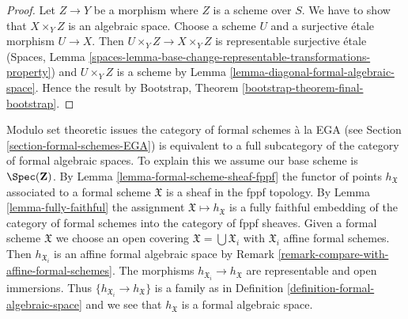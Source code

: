 \begin{proof}
Let $Z \to Y$ be a morphism where $Z$ is a scheme over $S$.
We have to show that $X \times_Y Z$ is an algebraic space.
Choose a scheme $U$ and a surjective \'etale morphism $U \to X$.
Then $U \times_Y Z \to X \times_Y Z$ is representable surjective \'etale
(Spaces, Lemma
\ref{spaces-lemma-base-change-representable-transformations-property})
and $U \times_Y Z$ is a scheme by
Lemma \ref{lemma-diagonal-formal-algebraic-space}.
Hence the result by
Bootstrap, Theorem \ref{bootstrap-theorem-final-bootstrap}.
\end{proof}

\begin{remark}
\label{remark-compare-with-formal-schemes}
Modulo set theoretic issues the category of formal schemes \`a la EGA
(see Section \ref{section-formal-schemes-EGA}) is equivalent to a full
subcategory of the category of formal algebraic spaces. To explain this
we assume our base scheme is $\Spec(\mathbf{Z})$. By
Lemma \ref{lemma-formal-scheme-sheaf-fppf} the functor of points
$h_\mathfrak X$ associated to a formal scheme $\mathfrak X$ is a sheaf
in the fppf topology. By Lemma \ref{lemma-fully-faithful}
the assignment $\mathfrak X \mapsto h_\mathfrak X$ is a fully faithful
embedding of the category of formal schemes into the category of
fppf sheaves. Given a formal scheme $\mathfrak X$ we choose an open covering
$\mathfrak X = \bigcup \mathfrak X_i$ with $\mathfrak X_i$
affine formal schemes. Then $h_{\mathfrak X_i}$
is an affine formal algebraic space by
Remark \ref{remark-compare-with-affine-formal-schemes}.
The morphisms $h_{\mathfrak X_i} \to h_\mathfrak X$ are representable
and open immersions. Thus $\{h_{\mathfrak X_i} \to h_\mathfrak X\}$
is a family as in Definition \ref{definition-formal-algebraic-space}
and we see that $h_\mathfrak X$ is a formal algebraic space.
\end{remark}

